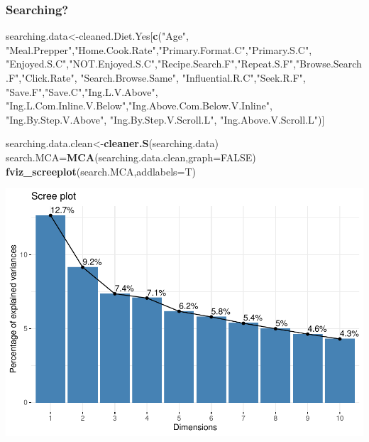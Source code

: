 \documentclass[
]{article}
\newenvironment{Shaded}{\begin{snugshade}}{\end{snugshade}}
\newcommand{\DataTypeTok}[1]{\textcolor[rgb]{0.13,0.29,0.53}{#1}}
\newcommand{\KeywordTok}[1]{\textcolor[rgb]{0.13,0.29,0.53}{\textbf{#1}}}
\newcommand{\NormalTok}[1]{#1}
\newcommand{\OtherTok}[1]{\textcolor[rgb]{0.56,0.35,0.01}{#1}}
\newcommand{\StringTok}[1]{\textcolor[rgb]{0.31,0.60,0.02}{#1}}
\begin{document}
\hypertarget{searching-1}{%
\subsubsection{Searching?}\label{searching-1}}

\begin{Shaded}
\begin{Highlighting}[]
\NormalTok{searching.data<-cleaned.Diet.Yes[}\KeywordTok{c}\NormalTok{(}\StringTok{"Age"}\NormalTok{, }\StringTok{"Meal.Prepper"}\NormalTok{,}\StringTok{"Home.Cook.Rate"}\NormalTok{,}\StringTok{"Primary.Format.C"}\NormalTok{,}\StringTok{"Primary.S.C"}\NormalTok{,}
            \StringTok{"Enjoyed.S.C"}\NormalTok{,}\StringTok{"NOT.Enjoyed.S.C"}\NormalTok{,}\StringTok{"Recipe.Search.F"}\NormalTok{,}\StringTok{"Repeat.S.F"}\NormalTok{,}\StringTok{"Browse.Search.F"}\NormalTok{,}\StringTok{"Click.Rate"}\NormalTok{,}
            \StringTok{"Search.Browse.Same"}\NormalTok{, }\StringTok{"Influential.R.C"}\NormalTok{,}\StringTok{"Seek.R.F"}\NormalTok{, }\StringTok{"Save.F"}\NormalTok{,}\StringTok{"Save.C"}\NormalTok{,}\StringTok{"Ing.L.V.Above"}\NormalTok{,}
            \StringTok{"Ing.L.Com.Inline.V.Below"}\NormalTok{,}\StringTok{"Ing.Above.Com.Below.V.Inline"}\NormalTok{,  }\StringTok{"Ing.By.Step.V.Above"}\NormalTok{,  }\StringTok{"Ing.By.Step.V.Scroll.L"}\NormalTok{,}
            \StringTok{"Ing.Above.V.Scroll.L"}\NormalTok{)]}

\NormalTok{searching.data.clean<-}\KeywordTok{cleaner.S}\NormalTok{(searching.data)}
\NormalTok{search.MCA=}\KeywordTok{MCA}\NormalTok{(searching.data.clean,}\DataTypeTok{graph=}\OtherTok{FALSE}\NormalTok{)}
\KeywordTok{fviz_screeplot}\NormalTok{(search.MCA,}\DataTypeTok{addlabels=}\NormalTok{T)}
\end{Highlighting}
\end{Shaded}

\includegraphics{Average-User-MCA_files/figure-latex/diet yes search-1.pdf}
\end{document}
